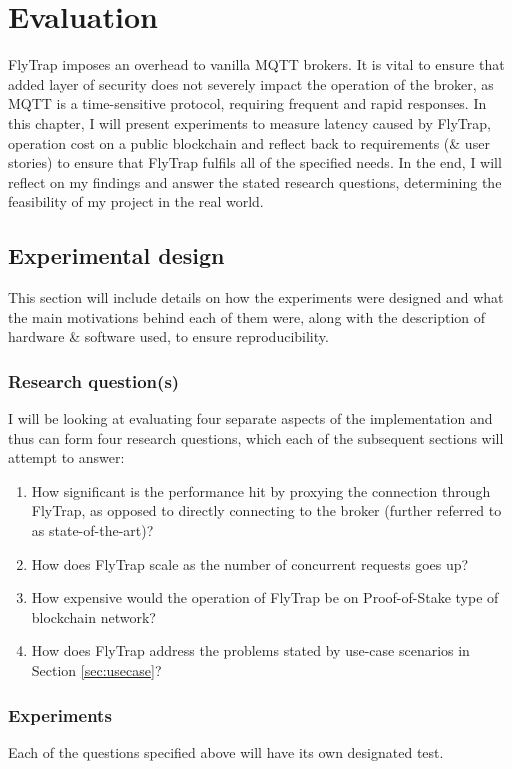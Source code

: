 \chapter{Evaluation}\label{chap:evaluation}
FlyTrap imposes an overhead to vanilla MQTT brokers. It is vital to ensure that added layer of security does not severely impact the operation of the broker, as MQTT is a time-sensitive protocol, requiring frequent and rapid responses. In this chapter, I will present experiments to measure latency caused by FlyTrap, operation cost on a public blockchain and reflect back to requirements (\& user stories) to ensure that FlyTrap fulfils all of the specified needs. In the end, I will reflect on my findings and answer the stated research questions, determining the feasibility of my project in the real world.

\section{Experimental design}
This section will include details on how the experiments were designed and what the main motivations behind each of them were, along with the description of hardware & software used, to ensure reproducibility.
\subsection{Research question(s)}
I will be looking at evaluating four separate aspects of the implementation and thus can form four research questions, which each of the subsequent sections will attempt to answer:
\begin{enumerate}
  \item How significant is the performance hit by proxying the connection through FlyTrap, as opposed to directly connecting to the broker (further referred to as state-of-the-art)?
  \item How does FlyTrap scale as the number of concurrent requests goes up?
  \item How expensive would the operation of FlyTrap be on Proof-of-Stake type of blockchain network?
  \item How does FlyTrap address the problems stated by use-case scenarios in Section \ref{sec:usecase}?
\end{enumerate}
\subsection{Experiments}
Each of the questions specified above will have its own designated test.

